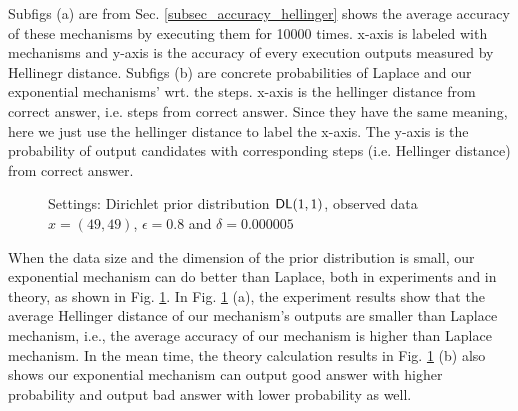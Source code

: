 Subfigs (a) are from Sec. \ref{subsec_accuracy_hellinger} shows the average accuracy of these mechanisms by executing them for 10000 times. x-axis is labeled with mechanisms and y-axis is the accuracy of every execution outputs measured by Hellinegr distance. Subfigs (b) are concrete probabilities of Laplace and our exponential mechanisms' wrt. the steps. x-axis is the hellinger distance from correct answer, i.e. steps from correct answer. Since they have the same meaning, here we just use the hellinger distance to label the x-axis. The y-axis is the probability of output candidates with corresponding steps (i.e. Hellinger distance) from correct answer.

\begin{figure}
\begin{center}
\centering
\caption{Settings: Dirichlet prior distribution $\mathsf{DL}(1,1)$, observed data $x = (49, 49) $, $\epsilon = 0.8$ and $\delta = 0.000005$}
\label{fig_theory_50_50}
\end{center}
\end{figure}

When the data size and the dimension of the prior distribution is small, our exponential mechanism can do better than Laplace, both in experiments and in theory, as shown in Fig. \ref{fig_theory_50_50}. In Fig. \ref{fig_theory_50_50} (a), the experiment results show that the average Hellinger distance of our mechanism's outputs are smaller than Laplace mechanism, i.e., the average accuracy of our mechanism is higher than Laplace mechanism. In the mean time, the theory calculation results in Fig. \ref{fig_theory_50_50} (b) also shows our exponential mechanism can output good answer with higher probability and output bad answer with lower probability as well.

